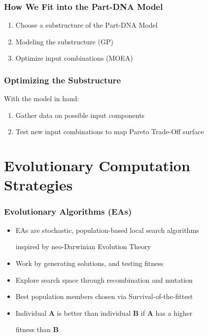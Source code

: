 \documentclass{beamer}
\begin{document}
\begin{frame}
\frametitle{How We Fit into the Part-DNA Model}
\begin{enumerate}
\item Choose a substructure of the Part-DNA Model
\item Modeling the substructure (GP)\pause
\item Optimize input combinations (MOEA)
\end{enumerate}
\end{frame}

\begin{frame}
\frametitle{Optimizing the Substructure}
With the model in hand:
\begin{enumerate}
\item Gather data on possible input components\pause
\item Test new input combinations to map Pareto Trade-Off surface
\end{enumerate}
\end{frame}

\section{Evolutionary Computation Strategies}

\begin{frame}
\frametitle{Evolutionary Algorithms (EAs)}
\begin{itemize}
\item EAs are stochastic, population-based local search algorithms

inspired by neo-Darwinian Evolution Theory\pause
\item Work by generating solutions, and testing fitness\pause
\item Explore search space through recombination and mutation\pause
\item Best population members chosen via Survival-of-the-fittest\pause
\item Individual \textbf{A} is better than individual \textbf{B} if \textbf{A} has a higher

fitness than \textbf{B}
\end{itemize}
\end{frame}
\end{document}
